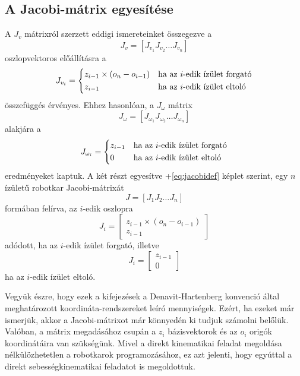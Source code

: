 \documentclass[12pt,a4paper]{report}
\theoremstyle{remark}
\theoremstyle{definition}
\begin{document}
\subsection{A Jacobi-mátrix egyesítése}
A $J_v$ mátrixról szerzett eddigi ismereteinket összegezve a
\begin{equation}
J_{v} = [J_{v_{1}} J_{v_{2}} \ldots J_{v_{n}}]
\end{equation}
oszlopvektoros előállításra a
\begin{equation}
J_{v_{i}} = \begin{dcases*}
    z_{i-1} \times (o_{n} - o_{i-1}) & ha az $i$-edik ízület forgató\\
    z_{i-1} & ha az $i$-edik ízület eltoló
    \end{dcases*}
\end{equation}
összefüggés érvényes. Ehhez hasonlóan, a $J_{\omega}$ mátrix
\begin{equation}
J_{\omega} = [J_{\omega_{1}} J_{\omega_{2}} \ldots J_{\omega_{n}}]
\end{equation}
alakjára a
\begin{equation}
J_{\omega_{i}} = \begin{dcases*}
    z_{i-1} & ha az $i$-edik ízület forgató\\
    0 & ha az $i$-edik ízület eltoló
    \end{dcases*}
\end{equation}
eredményeket kaptuk. A két részt egyesítve \az+\eqref{eq:jacobidef} képlet szerint, egy $n$ ízületű robotkar 
Jacobi-mátrixát
\begin{equation}
J = [J_1 J_2 \ldots J_n]
\end{equation}
formában felírva, az $i$-edik oszlopra
\begin{equation}
J_i = \begin{bmatrix}
    z_{i-1} \times (o_{n} - o_{i-1}) \\ 
    z_{i-1}
    \end{bmatrix} 
\end{equation}
adódott, ha az $i$-edik ízület forgató, illetve
\begin{equation}
J_i = \begin{bmatrix}
    z_{i-1} \\ 
    0
    \end{bmatrix} 
\end{equation}
ha az $i$-edik ízület eltoló.

Vegyük észre, hogy ezek a kifejezések a Denavit-Hartenberg konvenció által meghatározott koordináta-rendszereket 
leíró mennyiségek. Ezért, ha ezeket már ismerjük, akkor a Jacobi-mátrixot már könnyedén ki tudjuk számolni belőlük. 
Valóban, a mátrix megadásához csupán a $z_i$ bázisvektorok és az $o_i$ origók koordinátáira van szükségünk. Mivel a 
direkt kinematikai feladat megoldása nélkülözhetetlen a robotkarok programozásához, ez azt jelenti, hogy egyúttal a 
direkt sebességkinematikai feladatot is megoldottuk.
\end{document}
